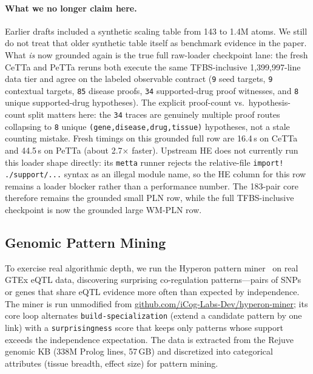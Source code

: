 \documentclass[11pt]{article}
\newcommand{\code}[1]{\texttt{#1}}
\newcommand{\PeTTa}{\textup{PeTTa}}
\newcommand{\HE}{\textup{HE}}
\newcommand{\CeTTa}{\textup{CeTTa}}
\begin{document}
\paragraph{What we no longer claim here.}
Earlier drafts included a synthetic scaling table from 143 to
1.4M atoms.  We still do not treat that older synthetic table itself as
benchmark evidence in the paper.  What \emph{is} now grounded again is
the true full raw-loader checkpoint lane: the fresh \CeTTa{} and
\PeTTa{} reruns both execute the same TFBS-inclusive
1{,}399{,}997-line data tier and agree on the labeled observable
contract
(\code{9} seed targets, \code{9} contextual targets, \code{85}
disease proofs, \code{34} supported-drug proof witnesses, and
\code{8} unique supported-drug hypotheses).  The explicit proof-count
vs.\ hypothesis-count split matters here: the \code{34} traces are
genuinely multiple proof routes collapsing to \code{8} unique
\code{(gene,disease,drug,tissue)} hypotheses, not a stale counting
mistake.  Fresh timings on this grounded full row are 16.4\,s on
\CeTTa{} and 44.5\,s on \PeTTa{} (about 2.7$\times$ faster).  Upstream \HE{} does not currently
run this loader shape directly: its \code{metta} runner rejects the
relative-file \code{import! ./support/...} syntax as an illegal module
name, so the \HE{} column for this row remains a loader blocker rather
than a performance number.  The 183-pair core therefore remains the
grounded small PLN row, while the full TFBS-inclusive checkpoint is now
the grounded large WM-PLN row.

\subsection{Genomic Pattern Mining}

To exercise real algorithmic depth, we run the Hyperon pattern
miner~\cite{metta} on real GTEx eQTL data, discovering surprising
co-regulation patterns---pairs of SNPs or genes that share eQTL
evidence more often than expected by independence.  The miner is run
unmodified from
\href{https://github.com/iCog-Labs-Dev/hyperon-miner}{github.com/iCog-Labs-Dev/hyperon-miner};
its core loop alternates \code{build-specialization} (extend a candidate
pattern by one link) with a \code{surprisingness} score that keeps only
patterns whose support exceeds the independence expectation.  The data
is extracted from the Rejuve genomic KB (338M Prolog lines, 57\,GB) and
discretized into categorical attributes (tissue breadth, effect size)
for pattern mining.
\end{document}

